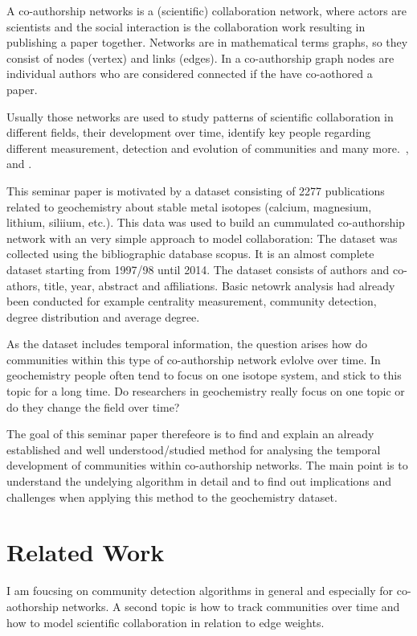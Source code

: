 \documentclass[runningheads,a4paper]{llncs}
\begin{document}
A co-authorship networks is a (scientific) collaboration network, where actors are scientists and the social interaction is the collaboration work resulting in publishing a paper together.
Networks are in mathematical terms graphs, so they consist of nodes (vertex) and links (edges).
In a co-authorship graph nodes are individual authors who are considered connected if the have co-aothored a paper.~\cite{newman2001structure}

Usually those networks are used to study patterns of scientific collaboration in different fields, their development over time, identify key people regarding different measurement, detection and evolution of communities and many more.~\cite{barabasi2002evolution}, \cite{newman2001structure} and \cite{newman2004coauthorship}.

This seminar paper is motivated by a dataset consisting of 2277 publications related to geochemistry about stable metal isotopes (calcium, magnesium, lithium, siliium, etc.). This data was used to build an cummulated co-authorship network with an very simple approach to model collaboration: 
The dataset was collected using the bibliographic database scopus.
It is an almost complete dataset starting from 1997/98 until 2014.
The dataset consists of authors and co-athors, title, year, abstract and affiliations.
Basic netowrk analysis had already been conducted for example centrality measurement, community detection, degree distribution and average degree.

As the dataset includes temporal information, the question arises how do communities within this type of co-authorship network evlolve over time. In geochemistry people often tend to focus on one isotope system, and stick to this topic for a long time. Do researchers in geochemistry really focus on one topic or do they change the field over time?

The goal of this seminar paper therefeore is to find and explain an already established and well understood/studied method for analysing the temporal development of communities within co-authorship networks. The main point is to understand the undelying algorithm in detail and to find out implications and challenges when applying this method to the geochemistry dataset.

\section{Related Work}
\label{related}
I am foucsing on community detection algorithms in general and especially for co-aothorship networks. A second topic is how to track communities over time and how to model scientific collaboration in relation to edge weights.
\end{document}
